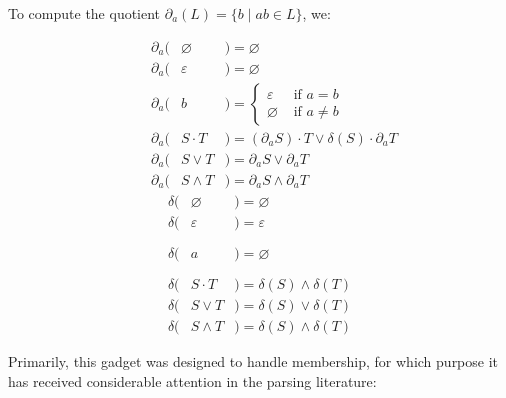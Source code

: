 \documentclass[sigplan,review,acmsmall,nonacm,screen,anonymous]{acmart}\settopmatter{printfolios=false,printccs=false,printacmref=false}
\begin{document}
  \begin{definition}[Brzozowski, 1964]
    To compute the quotient \(\partial_a(L) = \{b \mid ab \in L\}\), we:

    \vspace{-0.8cm}
    \begin{multicols}{2}
      \begin{eqnarray*}
        \phantom{--}\partial_a(& \varnothing &) = \varnothing                                           \\
        \phantom{--}\partial_a(& \varepsilon &) = \varnothing                                           \\
        \phantom{--}\partial_a(& b           &) = \begin{cases}\varepsilon &\text{ if } a = b\\ \varnothing &\text{ if } a \neq b \end{cases}\\
        \phantom{--}\partial_a(& S\cdot T    &) = (\partial_a S)\cdot T \vee \delta(S)\cdot\partial_a T \\
        \phantom{--}\partial_a(& S\vee  T    &) = \partial_a S \vee  \partial_a T                        \\
        \phantom{--}\partial_a(& S\land T    &) = \partial_a S \land \partial_a T
      \end{eqnarray*} \break\vspace{-0.45cm}
      \begin{eqnarray*}
        \delta(& \varnothing &) = \varnothing                                      \\
        \delta(& \varepsilon &) = \varepsilon                                      \\
        \delta(& a           &) = \varnothing\phantom{\begin{cases}\varepsilon\\\varnothing\end{cases}}\\
        \delta(& S\cdot T    &) = \delta(S) \land \delta(T)                        \\
        \delta(& S\vee T     &) = \delta(S) \vee  \delta(T)                        \\
        \delta(& S\land T    &) = \delta(S) \land \delta(T)
      \end{eqnarray*}
    \end{multicols}
  \end{definition}

  Primarily, this gadget was designed to handle membership, for which purpose it has received considerable attention in the parsing literature:
\end{document}
